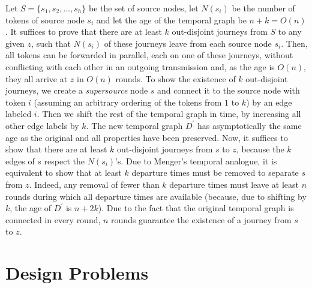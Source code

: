 \documentclass[oribibl, 11pt]{llncs}
\begin{document}
Let $S=\{s_1,s_2,\ldots,s_h\}$ be the set of source nodes, let $N(s_i)$ be the number of tokens of source node $s_i$ and let the age of the temporal graph be $n+k=O(n)$. It suffices to prove that there are at least $k$ out-disjoint journeys from $S$ to any given $z$, such that $N(s_i)$ of these journeys leave from each source node $s_i$. Then, all tokens can be forwarded in parallel, each on one of these journeys, without conflicting with each other in an outgoing transmission and, as the age is $O(n)$, they all arrive at $z$ in $O(n)$ rounds. To show the existence of $k$ out-disjoint journeys, we create a \emph{supersource} node $s$ and connect it to the source node with token $i$ (assuming an arbitrary ordering of the tokens from $1$ to $k$) by an edge labeled $i$. Then we shift the rest of the temporal graph in time, by increasing all other edge labels by $k$. The new temporal graph $D^\prime$ has asymptotically the same age as the original and all properties have been preserved. Now, it suffices to show that there are at least $k$ out-disjoint journeys from $s$ to $z$, because the $k$ edges of $s$ respect the $N(s_i)$'s. Due to Menger's temporal analogue, it is equivalent to show that at least $k$ departure times must be removed to separate $s$ from $z$. Indeed, any removal of fewer than $k$ departure times must leave at least $n$ rounds during which all departure times are available (because, due to shifting by $k$, the age of $D^\prime$ is $n+2k$). Due to the fact that the original temporal graph is connected in every round, $n$ rounds guarantee the existence of a journey from $s$ to $z$. 

\section{Design Problems}
\label{sec:design}
\end{document}
